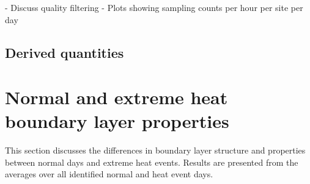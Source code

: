 \documentclass[11pt,a4paper]{article}
\begin{document}
- Discuss quality filtering
- Plots showing sampling counts per hour per site per day


\subsection{Derived quantities}

\section{Normal and extreme heat boundary layer properties}
This section discusses the differences in boundary layer structure and properties between normal days and extreme heat events. Results are presented from the averages over all identified normal and heat event days.
\end{document}
